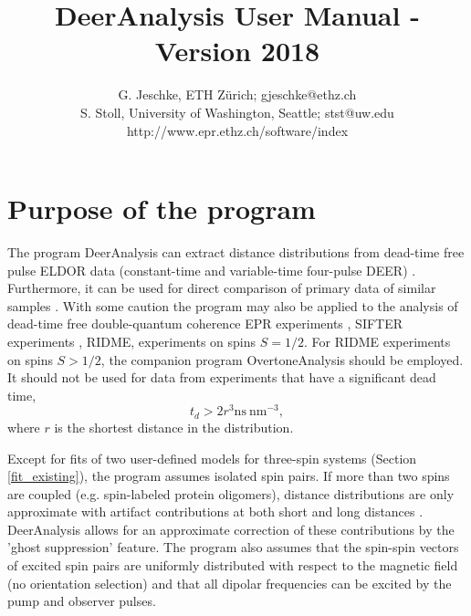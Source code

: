 \documentclass{article}
\begin{document}
\title{DeerAnalysis User Manual - Version 2018}

\author{G. Jeschke, ETH Z\"urich; gjeschke@ethz.ch \\ S. Stoll, University of Washington, Seattle; stst@uw.edu \\ http://www.epr.ethz.ch/software/index}


\maketitle 

\section{Purpose of the program}
\label{purpose}

The program DeerAnalysis can extract distance distributions from dead-time free pulse ELDOR data (constant-time and variable-time four-pulse DEER) \cite{pannier2000,jeschke2004b}. Furthermore, it can be used for direct comparison of primary data of similar samples \cite{jeschke2004a}. With some caution \cite{jeschke2001} the program may also be applied to the analysis of dead-time free double-quantum coherence EPR experiments \cite{borbat1999}, SIFTER experiments \cite{jeschke2000}, RIDME, \cite{kulik2001,milikisyants2009} experiments on spins $S = 1/2$. For RIDME experiments on spins $S > 1/2$, the companion program OvertoneAnalysis \cite{keller2017} should be employed. It should not be used for data from experiments that have a significant dead time,
%
\begin{equation}
	t_{d}> 2 r^{3} \mathrm{ns} \ \mathrm{nm}^{-3} ,
\end{equation}
where $r$ is the shortest distance in the distribution.

Except for fits of two user-defined models for three-spin systems (Section \ref{fit_existing}), the program assumes isolated spin pairs. If more than two spins are coupled (e.g. spin-labeled protein oligomers), distance distributions are only approximate with artifact contributions at both short and long distances \cite{jeschke2009}. DeerAnalysis allows for an approximate correction of these contributions by the 'ghost suppression' feature. The program also assumes that the spin-spin vectors of excited spin pairs are uniformly distributed with respect to the magnetic field (no orientation selection) and that all dipolar frequencies can be excited by the pump and observer pulses.
\end{document}

